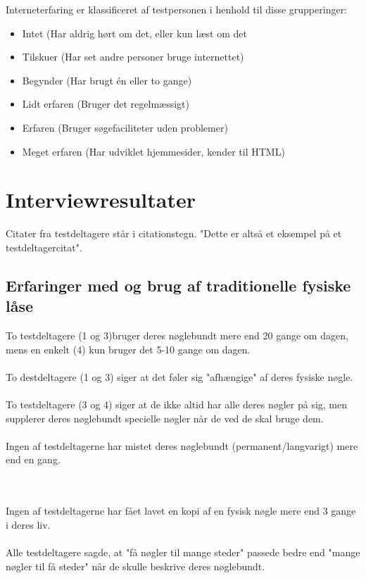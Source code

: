\documentclass[a4paper,12pt]{article}
\begin{document}
Interneterfaring er klassificeret af testpersonen i henhold til disse grupperinger:
\begin{itemize}


\item Intet (Har aldrig hørt om det, eller kun læst om det 
\item Tilskuer (Har set andre personer bruge internettet)  
\item Begynder (Har brugt én eller to gange)
\item Lidt erfaren (Bruger det regelmæssigt)
\item Erfaren (Bruger søgefaciliteter uden problemer)
\item Meget erfaren (Har udviklet hjemmesider, kender til HTML)

\end{itemize}

\section{Interviewresultater}
Citater fra testdeltagere står i citationstegn. "Dette er altså et eksempel på et testdeltagercitat".
\subsection{Erfaringer med og brug af traditionelle fysiske låse}

To testdeltagere (1 og 3)bruger deres nøglebundt mere end 20 gange om dagen, mens en enkelt (4) kun bruger det 5-10 gange om dagen.
\\ \\
To destdeltagere (1 og 3) siger at det føler sig "afhængige" af deres fysiske nøgle.
\\ \\
To testdeltagere (3 og 4) siger at de ikke altid har alle deres nøgler på sig, men supplerer deres nøglebundt specielle nøgler når de ved de skal bruge dem.
\\ \\
Ingen af testdeltagerne har mistet deres nøglebundt (permanent/langvarigt) mere end en gang.

\\ \\
Ingen af testdeltagerne har fået lavet en kopi af en fysisk nøgle mere end 3 gange i deres liv.
\\ \\
Alle testdeltagere sagde, at "få nøgler til mange steder" passede bedre end "mange nøgler til få steder" når de skulle beskrive deres nøglebundt.
\end{document}
